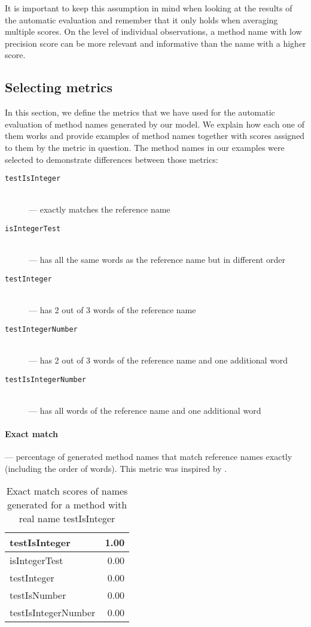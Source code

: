 It is important to keep this assumption in mind when looking at the results of the automatic evaluation and remember that it only holds when averaging multiple scores. On the level of individual observations, a method name with low precision score can be more relevant and informative than the name with a higher score.

\subsection{Selecting metrics}
\label{sec:Evaluation-Metrics}

In this section, we define the metrics that we have used for the automatic evaluation of method names generated by our model. We explain how each one of them works and provide examples of method names together with scores assigned to them by the metric in question. The method names in our examples were selected to demonstrate differences between those metrics:

\begin{description}
  \item [\texttt{testIsInteger}] \hfill \\
      --- exactly matches the reference name
  \item [\texttt{isIntegerTest}] \hfill \\
      --- has all the same words as the reference name but in different order
  \item [\texttt{testInteger}] \hfill \\
      --- has 2 out of 3 words of the reference name
  \item [\texttt{testIntegerNumber}] \hfill \\
      --- has 2 out of 3 words of the reference name and one additional word
  \item [\texttt{testIsIntegerNumber}] \hfill \\
      --- has all words of the reference name and one additional word
\end{description}

\paragraph{Exact match} --- percentage of generated method names that match reference names exactly (including the order of words). This metric was inspired by \cite{Alla16}.

\begin{table}[H]
\centering
\begin{tabular}{|l|r|}
  \hline
  testIsInteger & 1.00 \\
  \hline
  isIntegerTest & 0.00 \\
  \hline
  testInteger & 0.00 \\
  \hline
  testIsNumber & 0.00 \\
  \hline
  testIsIntegerNumber & 0.00 \\
  \hline
\end{tabular}
\caption{Exact match scores of names generated for a method with real name testIsInteger}
\end{table}

